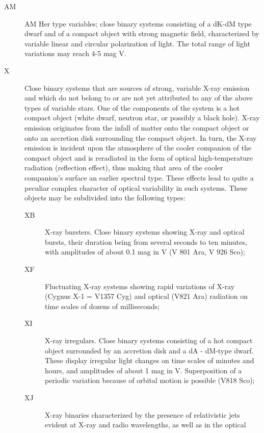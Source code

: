 \begin{description}
\item[AM]    AM Her type variables; close binary systems consisting of
	         a dK-dM type dwarf and of a compact object with strong magnetic field,
	         characterized by variable linear and circular polarization of light. The
             total range of light variations may reach 4-5 mag V.
\item[X]     Close binary systems that are sources of strong, variable
             X-ray emission and which do not belong to or are not yet attributed to
             any of the above types of variable stars. One of the components of the
             system is a hot compact object (white dwarf, neutron star, or possibly a
             black hole). X-ray emission originates from the infall of matter onto
             the compact object or onto an accretion disk surrounding the compact
             object. In turn, the X-ray emission is incident upon the atmosphere of
             the cooler companion of the compact object and is reradiated in the form
             of optical high-temperature radiation (reflection effect), thus making
             that area of the cooler companion's surface an earlier spectral type.
             These effects lead to quite a peculiar complex character of optical
             variability in such systems. These objects may be subdivided into the
             following types:
	\begin{description}
\item[XB]    X-ray bursters. Close binary systems showing X-ray and
             optical bursts, their duration being from several seconds to ten
             minutes, with amplitudes of about 0.1 mag in V (V 801 Ara, V 926 Sco);
\item[XF]    Fluctuating X-ray systems showing rapid variations of X-ray
             (Cygnus X-1 = V1357 Cyg) and optical (V821 Ara) radiation on time scales of dozens of milliseconds;
\item[XI]    X-ray irregulars. Close binary systems consisting of a hot
             compact object surrounded by an accretion disk and a dA - dM-type dwarf.
             These display irregular light changes on time scales of minutes and
             hours, and amplitudes of about 1 mag in V. Superposition of a periodic
             variation because of orbital motion is possible (V818 Sco);
\item[XJ]    X-ray binaries characterized by the presence of relativistic
             jets evident at X-ray and radio wavelengths, as well as in the optical

\end{description}
\end{description}
